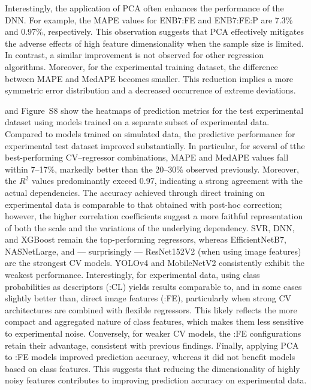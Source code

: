 \documentclass[10pt]{iopart}
\begin{document}
Interestingly, the application of PCA often enhances the performance of the DNN.
For example, the MAPE values for ENB7:FE and ENB7:FE:P are 7.3\% and 0.97\%, respectively.
This observation suggests that PCA effectively mitigates the adverse effects of high feature dimensionality
when the sample size is limited.
In contrast, a similar improvement is not observed for other regression algorithms.
Moreover, for the experimental training dataset,
the difference between MAPE and MedAPE becomes smaller.
This reduction implies a more symmetric error distribution and a decreased occurrence of extreme deviations.

 and Figure~S8 show the heatmaps of prediction metrics for the test experimental dataset
using models trained on a separate subset of experimental data.
Compared to models trained on simulated data, the predictive performance for experimental test dataset improved substantially.
In particular, for several of tthe best-performing CV–regressor combinations, MAPE and MedAPE values fall within 7–17\%,
markedly better than the 20–30\% observed previously.
Moreover, the $R^2$ values predominantly exceed 0.97, indicating a strong agreement with the actual dependencies.
The accuracy achieved through direct training on experimental data is comparable to that obtained with post-hoc correction;
however, the higher correlation coefficients suggest a more faithful representation of both the scale and the variations of the underlying dependency.
SVR, DNN, and XGBoost remain the top-performing regressors,
whereas EfficientNetB7, NASNetLarge, and --- surprisingly --- ResNet152V2
(when using image features) are the strongest CV models.
YOLOv4 and MobileNetV2 consistently exhibit the weakest performance.
Interestingly, for experimental data, using class probabilities as descriptors (:CL) yields results comparable to,
and in some cases slightly better than, direct image features (:FE),
particularly when strong CV architectures are combined with flexible regressors.
This likely reflects the more compact and aggregated nature of class features,
which makes them less sensitive to experimental noise.
Conversely, for weaker CV models, the :FE configurations retain their advantage, consistent with previous findings.
Finally, applying PCA to :FE models improved prediction accuracy, whereas it did not benefit models based on class features.
This suggests that reducing the dimensionality of highly noisy features contributes to improving prediction accuracy on experimental data.
\end{document}
